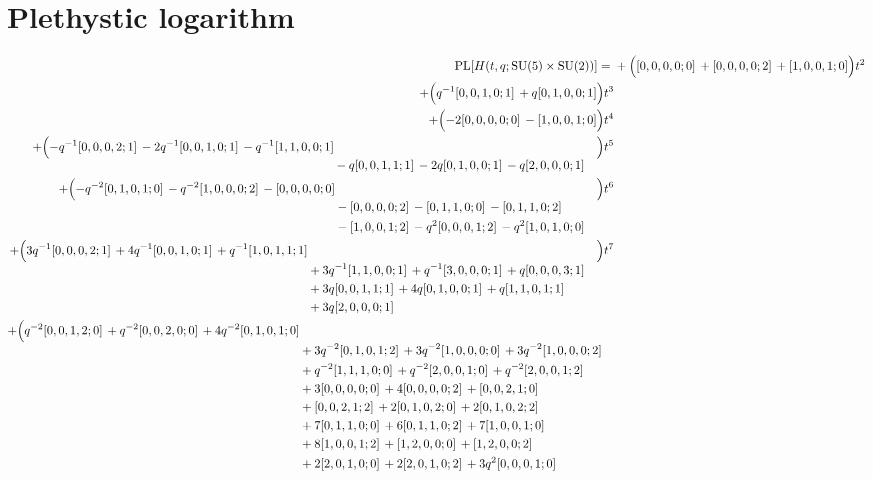 \documentclass[10pt]{article}
\begin{document}
\section{Plethystic logarithm}
\[
\begin{aligned}
\operatorname{PL}[H(t,q;\mathrm{SU}(5)\times\mathrm{SU}(2))] ={}&
  + \Bigl([0,0,0,0;0]\,+[0,0,0,0;2]\,+[1,0,0,1;0]\Bigr)t^{2} \\
  + \Bigl(q^{-1}[0,0,1,0;1]\,+q[0,1,0,0;1]\Bigr)t^{3} \\
  + \Bigl(-2[0,0,0,0;0]\,-[1,0,0,1;0]\Bigr)t^{4} \\
  + \Bigl(\begin{aligned}[t]-q^{-1}[0,0,0,2;1]\,-2q^{-1}[0,0,1,0;1]\,-q^{-1}[1,1,0,0;1] \\
  &{}-q[0,0,1,1;1]\,-2q[0,1,0,0;1]\,-q[2,0,0,0;1]\end{aligned}\Bigr)t^{5} \\
  + \Bigl(\begin{aligned}[t]-q^{-2}[0,1,0,1;0]\,-q^{-2}[1,0,0,0;2]\,-[0,0,0,0;0] \\
  &{}-[0,0,0,0;2]\,-[0,1,1,0;0]\,-[0,1,1,0;2] \\
  &{}-[1,0,0,1;2]\,-q^{2}[0,0,0,1;2]\,-q^{2}[1,0,1,0;0]\end{aligned}\Bigr)t^{6} \\
  + \Bigl(\begin{aligned}[t]3q^{-1}[0,0,0,2;1]\,+4q^{-1}[0,0,1,0;1]\,+q^{-1}[1,0,1,1;1] \\
  &{}+3q^{-1}[1,1,0,0;1]\,+q^{-1}[3,0,0,0;1]\,+q[0,0,0,3;1] \\
  &{}+3q[0,0,1,1;1]\,+4q[0,1,0,0;1]\,+q[1,1,0,1;1] \\
  &{}+3q[2,0,0,0;1]\end{aligned}\Bigr)t^{7} \\
  + \Bigl(\begin{aligned}[t]q^{-2}[0,0,1,2;0]\,+q^{-2}[0,0,2,0;0]\,+4q^{-2}[0,1,0,1;0] \\
  &{}+3q^{-2}[0,1,0,1;2]\,+3q^{-2}[1,0,0,0;0]\,+3q^{-2}[1,0,0,0;2] \\
  &{}+q^{-2}[1,1,1,0;0]\,+q^{-2}[2,0,0,1;0]\,+q^{-2}[2,0,0,1;2] \\
  &{}+3[0,0,0,0;0]\,+4[0,0,0,0;2]\,+[0,0,2,1;0] \\
  &{}+[0,0,2,1;2]\,+2[0,1,0,2;0]\,+2[0,1,0,2;2] \\
  &{}+7[0,1,1,0;0]\,+6[0,1,1,0;2]\,+7[1,0,0,1;0] \\
  &{}+8[1,0,0,1;2]\,+[1,2,0,0;0]\,+[1,2,0,0;2] \\
  &{}+2[2,0,1,0;0]\,+2[2,0,1,0;2]\,+3q^{2}[0,0,0,1;0] \\

\end{aligned}
\end{aligned}\]
\end{document}
